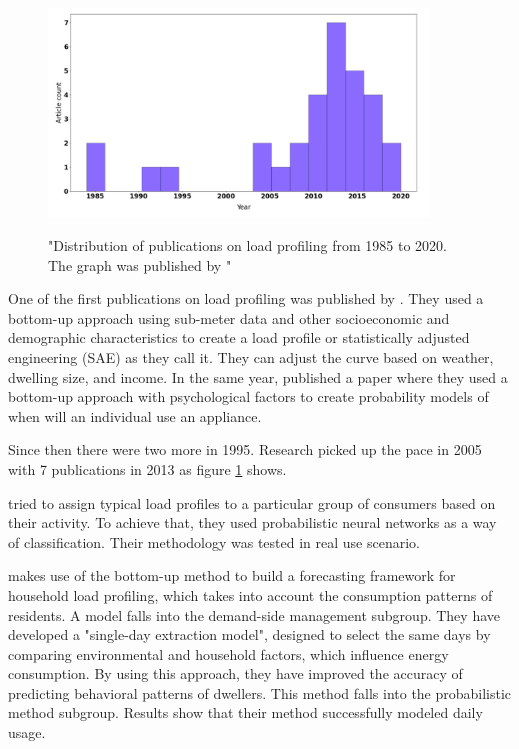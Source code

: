 \begin{figure}[h!]
	\centering
	\caption{"Distribution of publications on load profiling from 1985 to 2020. The graph was published by \protect\cite{Review2021}"}
	\includegraphics[width=0.9\textwidth]{Figures/publications.png}
	\label{fig:Distribution}
\end{figure}

One of the first publications on load profiling was published by \cite{TRAIN19851103}.
They used a bottom-up approach using sub-meter data and other socioeconomic and demographic characteristics 
to create a load profile or statistically adjusted engineering (SAE) as they call it.
They can adjust the curve based on weather, dwelling size, and income. 
In the same year, \cite{WALKER1985} published a paper where they used a bottom-up approach with psychological factors to create probability models of when will an individual use an appliance.

Since then there were two more in 1995. Research picked up the pace in 2005 with 7 publications in 2013 as figure \ref{fig:Distribution} shows.

\cite{GERBEC2005} tried to assign typical load profiles to a particular group of consumers based on their activity. 
To achieve that, they used probabilistic neural networks as a way of classification. Their methodology was tested in real use scenario. 

\cite{Gao2018} makes use of the bottom-up method to build a forecasting framework for household
load profiling, which takes into account the consumption patterns of residents. 
A model falls into the demand-side management subgroup.
They have developed a "single-day extraction model", designed to select the same days by comparing environmental and household factors, which influence energy consumption.
By using this approach, they have improved the accuracy of predicting behavioral patterns of dwellers. 
This method falls into the probabilistic method subgroup. Results show that their method successfully modeled daily usage.

